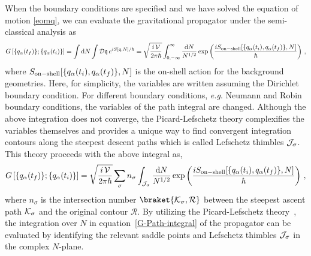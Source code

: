 \documentclass[superscriptaddress,aps,preprintnumbers,nofootinbib]{revtex4-2}
\begin{document}
When the boundary conditions are specified and we have solved the equation of motion \eqref{eomq}, we can evaluate the gravitational propagator under the semi-classical analysis as
\begin{equation}\label{G-Path-integral}
G\left[\{q_{\alpha}(t_f)\};\{q_{\alpha}(t_i)\}\right]   
 = \int \mathrm{d}N \int\mathcal{D}\mathfrak{q}  \, e^{iS\left[\mathfrak{q},N\right] / \hbar}
 = \sqrt{\frac{i\, {\cal V}}{2\pi\hbar}}\int_{0,-\infty}^\infty  \frac{\mathrm{d} N}{N^{1/2}} 
\exp \left(\frac{iS_{\rm on-shell}[\{q_{\alpha}(t_i),q_{\alpha}(t_f)\}, N]}{\hbar}\right)\,,
\end{equation}
where $S_{\rm on-shell}[\{q_{\alpha}(t_i),q_{\alpha}(t_f)\}, N]$ is the on-shell action for the background geometries. Here, for simplicity, the variables are written assuming the Dirichlet boundary condition. For different boundary conditions, \textit{e.g}. Neumann and Robin boundary conditions, the variables of the path integral are changed. Although the above integration does not converge, the Picard-Lefschetz theory complexifies the variables themselves and provides a unique way to find convergent integration contours along the steepest descent paths which is called Lefschetz thimbles $\cal J_\sigma$. This theory proceeds with the above integral as, 
\begin{equation}\label{G-Path-integral-pl}
G\left[\{q_{\alpha}(t_f)\};\{q_{\alpha}(t_i)\}\right]  =  \sqrt{\frac{i\, {\cal V}}{2\pi\hbar}}\sum_\sigma n_\sigma \int_{\cal J_\sigma} \frac{\mathrm{d} N}{N^{1/2}} 
\exp \left(\frac{iS_{\rm on-shell}[\{q_{\alpha}(t_i),q_{\alpha}(t_f)\}, N]}{\hbar}\right)\,,
\end{equation}
where $n_\sigma$ is the intersection number $\braket{\cal K_\sigma,\mathcal{R}}$ between the steepest ascent path $\cal K_\sigma$ and the original contour $\mathcal{R} $. By utilizing the Picard-Lefschetz theory~\cite{Witten:2010cx}, the integration over $N$ in equation~\eqref{G-Path-integral} of the propagator can be evaluated by identifying the relevant saddle points and Lefschetz thimbles $\cal J_\sigma$ in the complex $N$-plane. 
\end{document}
